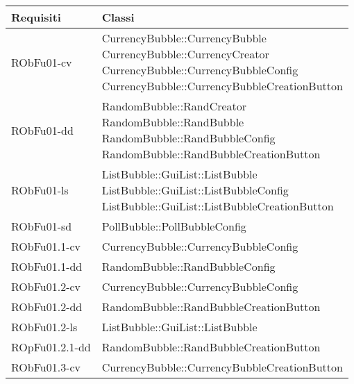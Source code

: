 \begin{center}
\begin{longtable}{|
*{1}{>{\centering\arraybackslash}m{2.5cm}|}
*{1}{>{\centering\arraybackslash}m{7.5cm}|}}
\hline \textbf{Requisiti} & \textbf{Classi}\\
\hline \endhead
\hline \endfoot

RObFu01-cv & \makecell[l]{CurrencyBubble::CurrencyBubble
\\CurrencyBubble::CurrencyCreator
\\CurrencyBubble::CurrencyBubbleConfig
\\CurrencyBubble::CurrencyBubbleCreationButton
\\}\\\hline
RObFu01-dd & \makecell[l]{RandomBubble::RandCreator
\\RandomBubble::RandBubble
\\RandomBubble::RandBubbleConfig
\\RandomBubble::RandBubbleCreationButton
\\}\\\hline
RObFu01-ls & \makecell[l]{ListBubble::GuiList::ListBubble
\\ListBubble::GuiList::ListBubbleConfig
\\ListBubble::GuiList::ListBubbleCreationButton
\\}\\\hline
RObFu01-sd & \makecell[l]{PollBubble::PollBubbleConfig
\\}\\\hline
RObFu01.1-cv & \makecell[l]{CurrencyBubble::CurrencyBubbleConfig
\\}\\\hline
RObFu01.1-dd & \makecell[l]{RandomBubble::RandBubbleConfig
\\}\\\hline
RObFu01.2-cv & \makecell[l]{CurrencyBubble::CurrencyBubbleConfig
\\}\\\hline
RObFu01.2-dd & \makecell[l]{RandomBubble::RandBubbleCreationButton
\\}\\\hline
RObFu01.2-ls & \makecell[l]{ListBubble::GuiList::ListBubble
\\}\\\hline
ROpFu01.2.1-dd & \makecell[l]{RandomBubble::RandBubbleCreationButton
\\}\\\hline
RObFu01.3-cv & \makecell[l]{CurrencyBubble::CurrencyBubbleCreationButton
\\}\\\hline

\end{longtable}
\end{center}
